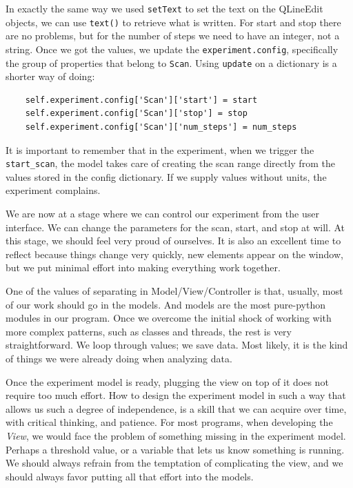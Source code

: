 In exactly the same way we used \texttt{setText} to set the text on the QLineEdit objects, we can use \texttt{text()} to retrieve what is written. For start and stop there are no problems, but for the number of steps we need to have an integer, not a string. Once we got the values, we update the \texttt{experiment.config}, specifically the group of properties that belong to \texttt{Scan}. Using \texttt{update} on a dictionary is a shorter way of doing:

\begin{verbatim}
    self.experiment.config['Scan']['start'] = start
    self.experiment.config['Scan']['stop'] = stop
    self.experiment.config['Scan']['num_steps'] = num_steps
\end{verbatim}

It is important to remember that in the experiment, when we trigger the \texttt{start\_scan}, the model takes care of creating the scan range directly from the values stored in the config dictionary. If we supply values without units, the experiment complains.



We are now at a stage where we can control our experiment from the user interface. We can change the parameters for the scan, start, and stop at will. At this stage, we should feel very proud of ourselves. It is also an excellent time to reflect because things change very quickly, new elements appear on the window, but we put minimal effort into making everything work together.

One of the values of separating in Model/View/Controller is that, usually, most of our work should go in the models. And models are the most pure-python modules in our program. Once we overcome the initial shock of working with more complex patterns, such as classes and threads, the rest is very straightforward. We loop through values; we save data. Most likely, it is the kind of things we were already doing when analyzing data.

Once the experiment model is ready, plugging the view on top of it does not require too much effort. How to design the experiment model in such a way that allows us such a degree of independence, is a skill that we can acquire over time, with critical thinking, and patience. For most programs, when developing the \emph{View}, we would face the problem of something missing in the experiment model. Perhaps a threshold value, or a variable that lets us know something is running. We should always refrain from the temptation of complicating the view, and we should always favor putting all that effort into the models.

